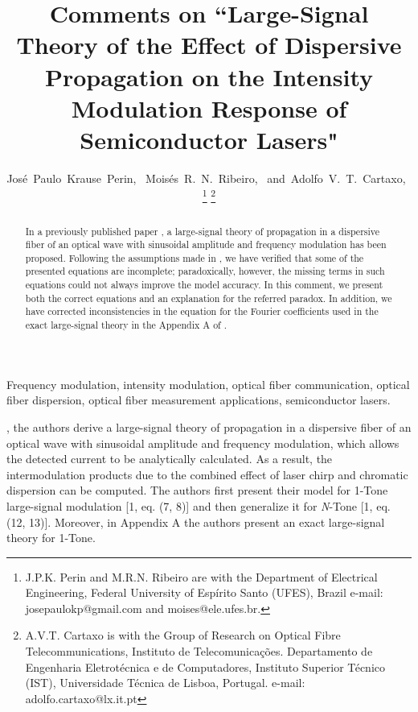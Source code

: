 \documentclass[journal]{IEEEtran}
\makeatletter
\def\markboth#1#2{\def\leftmark{\@IEEEcompsoconly{\sffamily}\MakeUppercase{\protect#1}}%
\def\rightmark{\@IEEEcompsoconly{\sffamily}\MakeUppercase{\protect#2}}}
\makeatother
\begin{document}
\title{Comments on ``Large-Signal Theory of the Effect of Dispersive Propagation on the Intensity Modulation Response of Semiconductor Lasers"}
\author{José~Paulo~Krause~Perin,~\IEEEmembership{}
        Moisés~R.~N.~Ribeiro,~\IEEEmembership{}
        and~Adolfo~V.~T.~Cartaxo,~%
\thanks{J.P.K. Perin and M.R.N. Ribeiro are with the Department
of Electrical Engineering, Federal University of Espírito Santo (UFES), Brazil e-mail: josepaulokp@gmail.com and moises@ele.ufes.br.}%
\thanks{A.V.T. Cartaxo is with the Group of Research on Optical Fibre Telecommunications, Instituto de Telecomunicações. Departamento de Engenharia Eletrotécnica e de Computadores, Instituto Superior Técnico (IST), Universidade Técnica de Lisboa, Portugal. e-mail: adolfo.cartaxo@lx.it.pt}%
}

\markboth{JOURNAL OF LIGHTWAVE TECHNOLOGY, VOL. ~XX, NO. ~X, JANUARY ~XXXX}%
{Shell \MakeLowercase{\textit{et al.}}: Bare Demo of IEEEtran.cls for Journals}
\maketitle
\begin{abstract}
In a previously published paper \cite{eva}, a large-signal theory of propagation in a dispersive fiber of an optical wave with sinusoidal amplitude and frequency modulation has been proposed. Following the assumptions made in \cite{eva}, we have verified that some of the presented equations are incomplete; paradoxically, however, the missing terms in such equations could not always improve the model accuracy. In this comment, we present both the correct equations and an explanation for the referred paradox. In addition, we have corrected inconsistencies in the equation for the Fourier coefficients used in the exact large-signal theory in the Appendix A of \cite{eva}.
\end{abstract}

\begin{IEEEkeywords}
Frequency modulation, intensity modulation, optical fiber communication, optical fiber dispersion, optical fiber
measurement applications, semiconductor lasers.
\end{IEEEkeywords}

\IEEEpeerreviewmaketitle
 \cite{eva}, the authors derive a large-signal theory of propagation in a dispersive fiber of an optical wave with sinusoidal amplitude and frequency modulation, which allows the detected current to be analytically calculated. As a result, the intermodulation products due to the combined effect of laser chirp and chromatic dispersion can be computed. The authors first present their model for 1-Tone large-signal modulation [1, eq. (7, 8)] and then generalize it for \emph{N}-Tone [1, eq.  (12, 13)]. Moreover, in Appendix A the authors present an exact large-signal theory for 1-Tone.
\end{document}
